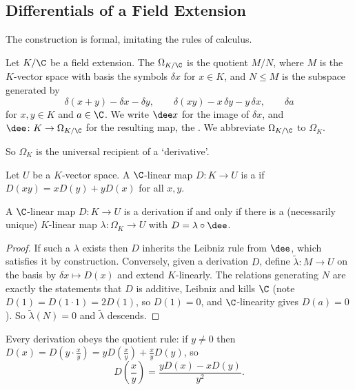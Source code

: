 \subsection{Differentials of a Field Extension}

The construction is formal, imitating the rules of calculus.

\begin{definition}
	Let $K/\C$ be a field extension. The  $\Omega_{K/\C}$ is the quotient $M/N$, where $M$ is the $K$-vector space with basis the symbols $\delta x$ for $x \in K$, and $N \leq M$ is the subspace generated by
	$$\delta(x+y) - \delta x - \delta y, \qquad \delta(xy) - x\,\delta y - y\,\delta x, \qquad \delta a$$
	for $x,y \in K$ and $a \in \C$. We write $\dee x$ for the image of $\delta x$, and $\dee \colon K \to \Omega_{K/\C}$ for the resulting map, the . We abbreviate $\Omega_{K/\C}$ to $\Omega_K$.
\end{definition}

So $\Omega_K$ is the universal recipient of a `derivative'.

\begin{definition}[Derivation]
	Let $U$ be a $K$-vector space. A $\C$-linear map $D \colon K \to U$ is a  if $D(xy) = xD(y) + yD(x)$ for all $x,y$.
\end{definition}

\begin{lemma}\label{lem:univderiv}
	A $\C$-linear map $D \colon K \to U$ is a derivation if and only if there is a (necessarily unique) $K$-linear map $\lambda \colon \Omega_K \to U$ with $D = \lambda\circ\dee$.
\end{lemma}

\begin{proof}
	If such a $\lambda$ exists then $D$ inherits the Leibniz rule from $\dee$, which satisfies it by construction. Conversely, given a derivation $D$, define $\tilde\lambda \colon M \to U$ on the basis by $\delta x \mapsto D(x)$ and extend $K$-linearly. The relations generating $N$ are exactly the statements that $D$ is additive, Leibniz and kills $\C$ (note $D(1) = D(1\cdot1) = 2D(1)$, so $D(1) = 0$, and $\C$-linearity gives $D(a) = 0$). So $\tilde\lambda(N) = 0$ and $\tilde\lambda$ descends.
\end{proof}

\begin{remark}
	Every derivation obeys the quotient rule: if $y \neq 0$ then $D(x) = D(y\cdot\frac xy) = yD(\frac xy) + \frac xy D(y)$, so
	$$D\!\left(\frac xy\right) = \frac{yD(x) - xD(y)}{y^2}.$$
\end{remark}

